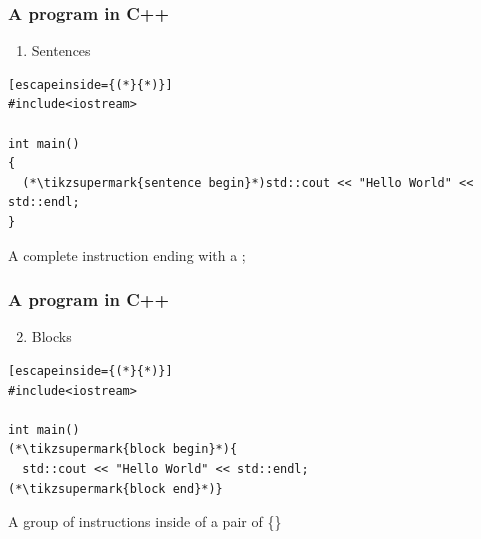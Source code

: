 \documentclass[14pt,a4paper,dvipsnames,usenames]{beamer}
\begin{document}
\begin{frame}[fragile]
  \frametitle{A program in C++}


  \begin{enumerate}
    \item Sentences
  \end{enumerate}

  \vspace{1em}

  \begin{lstlisting}[escapeinside={(*}{*)}]
#include<iostream>

int main()
{
  (*\tikzsupermark{sentence begin}*)std::cout << "Hello World" << std::endl;
}
  \end{lstlisting}

  \vspace{1em}

  \begin{minipage}[b][2ex]{\textwidth}
    A complete instruction ending with a \hskip5pt {\large\color{Tropiteal};}
  \end{minipage}
 
\end{frame}

\begin{frame}[fragile]
  \frametitle{A program in C++}


  \begin{enumerate}
    \setcounter{enumi}{1}
    \item Blocks
  \end{enumerate}

  \vspace{1em}

  \begin{lstlisting}[escapeinside={(*}{*)}]
#include<iostream>

int main()
(*\tikzsupermark{block begin}*){
  std::cout << "Hello World" << std::endl;
(*\tikzsupermark{block end}*)}
  \end{lstlisting}

  \vspace{1em}

  \begin{minipage}[b][2ex]{\textwidth}
    A group of instructions inside of a pair of \hskip5pt {\large\color{Tropiteal}\{\}}
  \end{minipage}

\end{frame}
\end{document}

